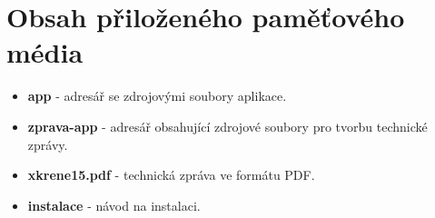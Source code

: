 
\chapter{Obsah přiloženého paměťového média}

\begin{itemize}
    \item{\textbf{app} - adresář se zdrojovými soubory aplikace.}
    \item{\textbf{zprava-app} - adresář obsahující zdrojové soubory pro tvorbu technické zprávy.}
    \item{\textbf{xkrene15.pdf} - technická zpráva ve formátu PDF.}
    \item{\textbf{instalace} - návod na instalaci.}
\end{itemize}





